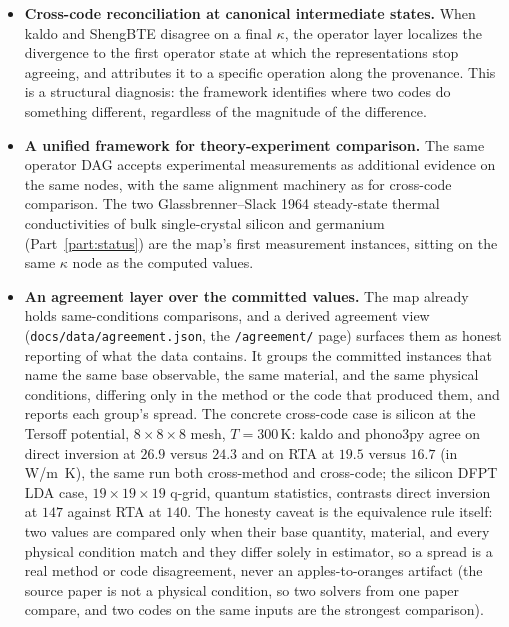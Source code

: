\documentclass[11pt,a4paper]{article}
\begin{document}
\begin{itemize}[leftmargin=2em]
  \item \textbf{Cross-code reconciliation at canonical intermediate states.} When kaldo and
        ShengBTE disagree on a final $\kappa$, the operator layer localizes the divergence to the
        first operator state at which the representations stop agreeing, and attributes it to a
        specific operation along the provenance. This is a structural diagnosis: the framework
        identifies where two codes do something different, regardless of the magnitude of the
        difference.
  \item \textbf{A unified framework for theory-experiment comparison.} The same operator DAG
        accepts experimental measurements as additional evidence on the same nodes,
        with the same alignment machinery as for cross-code comparison. The two
        Glassbrenner--Slack 1964 steady-state thermal conductivities of bulk
        single-crystal silicon and germanium (Part~\ref{part:status}) are the map's
        first measurement instances, sitting on the same $\kappa$ node as the
        computed values.
  \item \textbf{An agreement layer over the committed values.} The map already holds
        same-conditions comparisons, and a derived agreement view
        (\texttt{docs/data/agreement.json}, the \texttt{/agreement/} page) surfaces
        them as honest reporting of what the data contains. It groups the committed
        instances that name the same base observable, the same material, and the
        same physical conditions, differing only in the method or the code that
        produced them, and reports each group's spread. The concrete cross-code
        case is silicon at the Tersoff potential, $8\times 8\times 8$ mesh,
        $T=300\,\text{K}$: kaldo and phono3py agree on direct inversion at $26.9$
        versus $24.3$ and on RTA at $19.5$ versus $16.7$ (in W/m~K), the same run
        both cross-method and cross-code; the silicon DFPT LDA case, $19\times
        19\times 19$ q-grid, quantum statistics, contrasts direct inversion at
        $147$ against RTA at $140$. The honesty caveat is the equivalence rule
        itself: two values are compared only when their base quantity, material,
        and every physical condition match and they differ solely in estimator,
        so a spread is a real method or code disagreement, never an
        apples-to-oranges artifact (the source paper is not a physical condition,
        so two solvers from one paper compare, and two codes on the same inputs
        are the strongest comparison).
\end{itemize}
\end{document}
